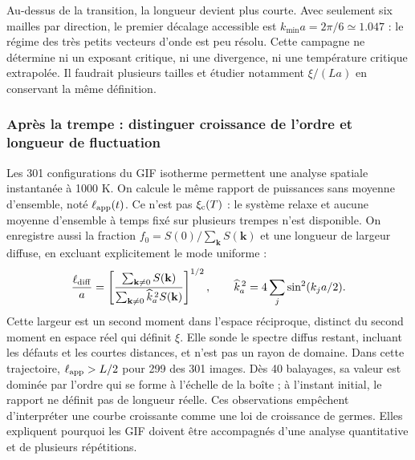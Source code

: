 Au-dessus de la transition, la longueur devient plus courte. Avec seulement six mailles par direction, le premier décalage accessible est $k_{\min}a=2\pi/6\simeq1.047$ : le régime des très petits vecteurs d'onde est peu résolu. Cette campagne ne détermine ni un exposant critique, ni une divergence, ni une température critique extrapolée. Il faudrait plusieurs tailles et étudier notamment $\xi/(La)$ en conservant la même définition.
\clearpage
\subsubsection{Après la trempe : distinguer croissance de l’ordre et longueur de fluctuation}
Les 301 configurations du GIF isotherme permettent une analyse spatiale instantanée à 1000 K. On calcule le même rapport de puissances sans moyenne d'ensemble, noté $\ell_{\rm app}(t)$. Ce n'est pas $\xi_{\rm c}(T)$ : le système relaxe et aucune moyenne d'ensemble à temps fixé sur plusieurs trempes n'est disponible.
On enregistre aussi la fraction $f_0=S(0)/\sum_{\mathbf k}S(\mathbf k)$ et une longueur de largeur diffuse, en excluant explicitement le mode uniforme :
\[\frac{\ell_{\rm diff}}a=\left[\frac{\sum_{\mathbf k\ne0}S(\mathbf k)}{\sum_{\mathbf k\ne0}\widehat k_a^{\,2}S(\mathbf k)}\right]^{1/2},\qquad \widehat k_a^{\,2}=4\sum_j\sin^2(k_ja/2).\]
Cette largeur est un second moment dans l'espace réciproque, distinct du second moment en espace réel qui définit $\xi$. Elle sonde le spectre diffus restant, incluant les défauts et les courtes distances, et n'est pas un rayon de domaine.
Dans cette trajectoire, $\ell_{\rm app}>L/2$ pour 299 des 301 images. Dès 40 balayages, sa valeur est dominée par l'ordre qui se forme à l'échelle de la boîte ; à l'instant initial, le rapport ne définit pas de longueur réelle. Ces observations empêchent d'interpréter une courbe croissante comme une loi de croissance de germes. Elles expliquent pourquoi les GIF doivent être accompagnés d'une analyse quantitative et de plusieurs répétitions.
